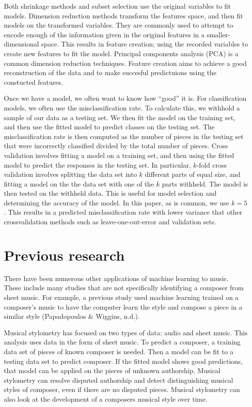 \documentclass[12pt,twoside]{reedthesis}
\theoremstyle{definition}
\theoremstyle{definition}
\theoremstyle{definition}
\theoremstyle{remark}
\begin{document}
Both shrinkage methods and subset selection use the original variables
to fit models. Dimension reduction methods transform the features space,
and then fit models on the transformed variables. They are commonly used
to attempt to encode enough of the information given in the original
features in a smaller-dimensional space. This results in feature
creation; using the recorded variables to create new features to fit the
model. Principal components analysis (PCA) is a common dimension
reduction techniques. Feature creation aims to achieve a good
reconstruction of the data and to make succesful predictuions using the
constucted features.

Once we have a model, we often want to know how ``good'' it is. For
classification models, we often use the misclassification rate. To
calculate this, we withhold a sample of our data as a testing set. We
then fit the model on the training set, and then use the fitted model to
predict classes on the testing set. The misclassification rate is then
computed as the number of pieces in the testing set that were
incorrectly classified divided by the total number of pieces. Cross
validation involves fitting a model on a training set, and then using
the fitted model to predict the responses in the testing set. In
particular, \(k\)-fold cross validation involves splitting the data set
into \(k\) different parts of equal size, and fitting a model on the the
data set with one of the \(k\) parts withheld. The model is then tested
on the withheld data. This is useful for model selection and determining
the accuracy of the model. In this paper, as is common, we use
\(k = 5\). This results in a predicted misclassification rate with lower
variance that other crossvalidation methods such as leave-one-out-error
and validation sets.

\section{Previous research}\label{previous-research}

There have been numerous other applications of machine learning to
music. These include many studies that are not specifically identifying
a composer from sheet music. For example, a previous study used machine
learning trained on a composer's music to have the computer learn the
style and compose a piece in a similar style (Papadopoulos \& Wiggins,
n.d.).

Musical stylometry has focused on two types of data: audio and sheet
music. This analysis uses data in the form of sheet music. To predict a
composer, a training data set of pieces of known composer is needed.
Then a model can be fit to a testing data set to predict composer. If
the fitted model shows good predictions, that model can be applied on
the pieces of unknown authorship. Musical stylometry can resolve
disputed authorship and detect distinguishing musical styles of
composer, even if there are no disputed pieces. Musical stylometry can
also look at the development of a composers musical style over time.
\end{document}
